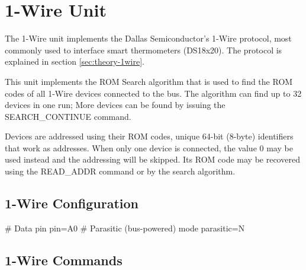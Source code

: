 \section{1-Wire Unit}

The 1-Wire unit implements the Dallas Semiconductor's 1-Wire protocol, most commonly used to interface smart thermometers (DS18x20). The protocol is explained in section \ref{sec:theory-1wire}.

This unit implements the ROM Search algorithm that is used to find the ROM codes of all 1-Wire devices connected to the bus. The algorithm can find up to 32 devices in one run; More devices can be found by issuing the SEARCH\_CONTINUE command.

Devices are addressed using their ROM codes, unique 64-bit (8-byte) identifiers that work as addresses. When only one device is connected, the value 0 may be used instead and the addressing will be skipped. Its ROM code may be recovered using the READ\_ADDR command or by the search algorithm.

\subsection{1-Wire Configuration}

\begin{inicode}
[1WIRE:ow@7]
# Data pin
pin=A0
# Parasitic (bus-powered) mode
parasitic=N
\end{inicode}

\subsection{1-Wire Commands}

